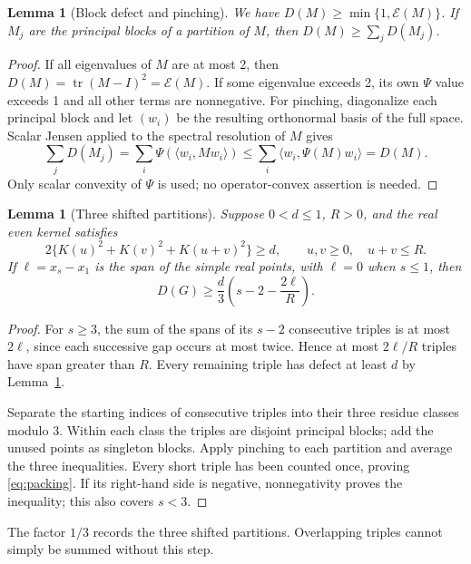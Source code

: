\documentclass[11pt]{article}
\newtheorem{lemma}[theorem]{Lemma}
\theoremstyle{remark}
\DeclareMathOperator{\tr}{tr}
\newcommand{\cE}{\mathcal E}
\begin{document}
\begin{lemma}[Block defect and pinching]\label{lem:pinch}
We have $D(M)\ge\min\{1,\cE(M)\}$. If $M_j$ are the principal blocks
of a partition of $M$, then $D(M)\ge\sum_jD(M_j)$.
\end{lemma}
\begin{proof}
If all eigenvalues of $M$ are at most 2, then
$D(M)=\tr(M-I)^2=\cE(M)$. If some eigenvalue exceeds 2, its own
$\Psi$ value exceeds 1 and all other terms are nonnegative.
For pinching, diagonalize each principal block and let $(w_i)$ be the
resulting orthonormal basis of the full space. Scalar Jensen applied to
the spectral resolution of $M$ gives
\[
 \sum_jD(M_j)=\sum_i\Psi(\langle w_i,Mw_i\rangle)
 \le\sum_i\langle w_i,\Psi(M)w_i\rangle=D(M).
\]
Only scalar convexity of $\Psi$ is used; no operator-convex assertion is
needed.
\end{proof}

\begin{lemma}[Three shifted partitions]\label{lem:triples}
Suppose $0<d\le1$, $R>0$, and the real even kernel satisfies
\begin{equation}\label{eq:triangle}
 2\{K(u)^2+K(v)^2+K(u+v)^2\}\ge d,
 \qquad u,v\ge0,\quad u+v\le R.
\end{equation}
If $\ell=x_s-x_1$ is the span of the simple real points, with $\ell=0$
when $s\le1$, then
\begin{equation}\label{eq:packing}
 D(G)\ge\frac d3\left(s-2-\frac{2\ell}{R}\right).
\end{equation}
\end{lemma}
\begin{proof}
For $s\ge3$, the sum of the spans of its $s-2$ consecutive triples is
at most $2\ell$, since each successive gap occurs at most twice. Hence
at most $2\ell/R$ triples have span greater than $R$. Every remaining
triple has defect at least $d$ by Lemma~\ref{lem:pinch}.

Separate the starting indices of consecutive triples into their three
residue classes modulo 3. Within each class the triples are disjoint
principal blocks; add the unused points as singleton blocks. Apply
pinching to each partition and average the three inequalities. Every
short triple has been counted once, proving \eqref{eq:packing}. If its
right-hand side is negative, nonnegativity proves the inequality; this
also covers $s<3$.
\end{proof}

The factor $1/3$ records the three shifted partitions. Overlapping triples
cannot simply be summed without this step.
\end{document}
